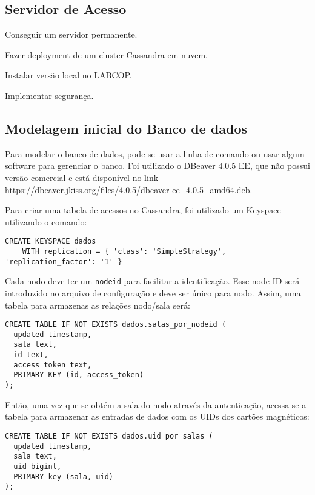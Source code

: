 \documentclass[11pt]{article}
\begin{document}
\subsection{Servidor de Acesso}

\begin{todobox}
\begin{todolist}
\item Conseguir um servidor permanente.
\item Fazer deployment de um cluster Cassandra em nuvem.
\item[\done] Instalar versão local no LABCOP.
\item[\done] Implementar segurança.
\end{todolist}
\end{todobox}

\subsection{Modelagem inicial do Banco de dados}

Para modelar o banco de dados, pode-se usar a linha de comando ou usar algum software para gerenciar o banco. Foi utilizado o DBeaver 4.0.5 EE, que não possui versão comercial e está disponível no link \url{https://dbeaver.jkiss.org/files/4.0.5/dbeaver-ee_4.0.5_amd64.deb}.

Para criar uma tabela de acessos no Cassandra, foi utilizado um Keyspace utilizando o comando:

\begin{lstlisting}
CREATE KEYSPACE dados 
	WITH replication = { 'class': 'SimpleStrategy', 'replication_factor': '1' }
\end{lstlisting}

Cada nodo deve ter um \texttt{nodeid} para facilitar a identificação. Esse node ID será introduzido no arquivo de configuração e deve ser único para nodo. Assim, uma tabela para armazenas as relações nodo/sala será:

\begin{lstlisting}
CREATE TABLE IF NOT EXISTS dados.salas_por_nodeid ( 
  updated timestamp,
  sala text,
  id text,
  access_token text,
  PRIMARY KEY (id, access_token)
);
\end{lstlisting}


Então, uma vez que se obtém a sala do nodo através da autenticação, acessa-se a tabela para armazenar as entradas de dados com os UIDs dos cartões magnéticos:

\begin{lstlisting}
CREATE TABLE IF NOT EXISTS dados.uid_por_salas ( 
  updated timestamp,
  sala text,
  uid bigint,
  PRIMARY key (sala, uid)
);
\end{lstlisting}
\end{document}
